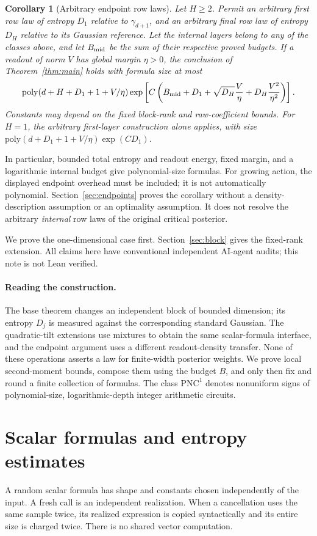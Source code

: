 \documentclass[11pt]{article}
\newtheorem{corollary}[theorem]{Corollary}
\newcommand{\poly}{\mathrm{poly}}
\newcommand{\PNC}{\mathrm{PNC}^{1}}
\begin{document}
\begin{corollary}[Arbitrary endpoint row laws]
\label{cor:endpoints}
Let $H\ge2$. Permit an arbitrary first row law of entropy $D_1$ relative to $\gamma_{d+1}$, and an arbitrary final row law of entropy $D_H$ relative to its Gaussian reference. Let the internal layers belong to any of the classes above, and let $B_{\rm mid}$ be the sum of their respective proved budgets. If a readout of norm $V$ has global margin $\eta>0$, the conclusion of Theorem~\ref{thm:main} holds with formula size at most
\[
 \poly(d+H+D_1+1+V/\eta)
 \exp\left[C\left(B_{\rm mid}+D_1+
       \sqrt{D_H}\frac V\eta+D_H\frac{V^2}{\eta^2}\right)\right].
\]
Constants may depend on the fixed block-rank and raw-coefficient bounds. For $H=1$, the arbitrary first-layer construction alone applies, with size
$\poly(d+D_1+1+V/\eta)\exp(CD_1)$.
\end{corollary}
In particular, bounded total entropy and readout energy, fixed margin, and a logarithmic internal budget give polynomial-size formulas. For growing action, the displayed endpoint overhead must be included; it is not automatically polynomial. Section~\ref{sec:endpoints} proves the corollary without a density-description assumption or an optimality assumption. It does not resolve the arbitrary \emph{internal} row laws of the original critical posterior.

We prove the one-dimensional case first. Section~\ref{sec:block} gives the fixed-rank extension. All claims here have conventional independent AI-agent audits; this note is not Lean verified.

\paragraph{Reading the construction.}
The base theorem changes an independent block of bounded dimension;
its entropy $D_j$ is measured against the corresponding standard
Gaussian. The quadratic-tilt extensions use mixtures to obtain the same
scalar-formula interface, and the endpoint argument uses a different
readout-density transfer. None of these operations asserts a law for
finite-width posterior weights. We prove local second-moment bounds,
compose them using the budget $B$, and only then fix and round a finite
collection of formulas. The class $\PNC$ denotes nonuniform signs of
polynomial-size, logarithmic-depth integer arithmetic circuits.

\section{Scalar formulas and entropy estimates}
A random scalar formula has shape and constants chosen independently of the input. A fresh call is an independent realization. When a cancellation uses the same sample twice, its realized expression is copied syntactically and its entire size is charged twice. There is no shared vector computation.
\end{document}
